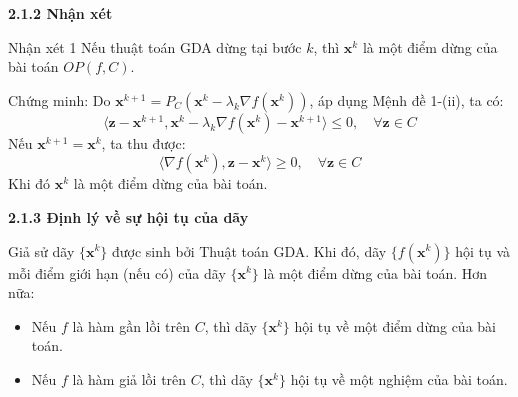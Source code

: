 \begin{frame}{\textbf{\large 2.1.2 Nhận xét}}
    \vspace*{-1cm}
    \begin{exampleblock}{Nhận xét 1}
        Nếu thuật toán GDA dừng tại bước $k$, thì $\mathbf{x}^k$ là một điểm dừng của bài toán $OP(f,C)$.
    \end{exampleblock}
    \pause
    \begin{block}{Chứng minh:} Do $\mathbf{x}^{k+1} = P_C(\mathbf{x}^k - \lambda_k \nabla f(\mathbf{x}^k))$, áp dụng Mệnh đề 1-(ii), ta có:
    \begin{equation} \label{eq:1}
        \langle \mathbf{z} - \mathbf{x}^{k+1} ,  \mathbf{x}^k - \lambda_k \nabla f(\mathbf{x}^k) - \mathbf{x}^{k+1} \rangle  \le 0, \quad \forall \mathbf{z} \in C
    \end{equation}
    \pause
        Nếu $\mathbf{x}^{k+1} = \mathbf{x}^k$, ta thu được:
    \begin{equation} \label{eq:2}
        \langle \nabla f(\mathbf{x}^k), \mathbf{z} - \mathbf{x}^k \rangle \ge 0, \quad \forall \mathbf{z} \in C
    \end{equation}
    \pause
        Khi đó $\mathbf{x}^k$ là một điểm dừng của bài toán.
    \end{block}  %
    
\end{frame}



\begin{frame}{\textbf{\large 2.1.3 Định lý về sự hội tụ của dãy}}
    \vspace*{-1cm}
    \begin{thm}
        Giả sử dãy $\{\mathbf{x}^k\}$ được sinh bởi Thuật toán GDA. Khi đó, dãy $\{f(\mathbf{x}^k)\}$ hội tụ và mỗi điểm giới hạn (nếu có) của dãy $\{\mathbf{x}^k\}$ là một điểm dừng của bài toán.
        Hơn nữa:
        \begin{itemize}
            \item Nếu $f$ là hàm gần lồi trên $C$, thì dãy $\{\mathbf{x}^k\}$ hội tụ về một điểm dừng của bài toán.
            \item Nếu $f$ là hàm giả lồi trên $C$, thì dãy $\{\mathbf{x}^k\}$ hội tụ về một nghiệm của bài toán.
        \end{itemize}
    \end{thm}
\end{frame}

